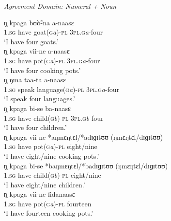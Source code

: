 \begin{exe}
  \ex\label{ex:NUM-domnum}\textit{Agreement Domain: Numeral + Noun}\\

\begin{xlist}
\ex\label{ex:NUM-domnumA.pl}
\gll   ŋ̩  kpaga   bʊ̃ʊ̃-na a-naasɛ  \\
       \textsc{1.sg}  {have}  {goat(\textsc{g}\textit{a})-\textsc{pl}} 
{\textsc{3pl.g}\textit{a}-four} \\
\glt `I have four goats.' \\


\ex\label{ex:NUM-domnumH-.pl}
\gll   ŋ̩  kpaga vii-ne  a-naasɛ  \\
        \textsc{1.sg}  {have}  {pot(\textsc{g}\textit{a})-\textsc{pl}}  
{\textsc{3pl.g}\textit{a}-four} \\
\glt `I have four cooking pots.' \\


\ex\label{ex:NUM-domabst.pl}
\gll  ŋ̩ ŋma  taa-ta a-naasɛ  \\
        \textsc{1.sg}  {speak}  {language(\textsc{g}\textit{a})-\textsc{pl}}  
{\textsc{3pl.g}\textit{a}-four} \\
\glt `I speak four languages.' \\


\ex\label{ex:NUM-domnumH+.pl}
\gll   ŋ̩  kpaga bi-se  ba-naasɛ \\
        \textsc{1.sg}  {have}  {child(\textsc{g}\textit{b})-\textsc{pl}}  
{\textsc{3pl.g}\textit{b}-four} \\
\glt `I have four children.' \\

\ex\label{ex:NUM-ungramhum-}
\gll   ŋ̩  kpaga vii-ne   *aŋmɛŋtɛl/*adɪɡɪtʊʊ (ŋmɛŋtɛl/dɪɡɪtʊʊ)\\
        \textsc{1.sg}  {have}  {pot(\textsc{g}\textit{a})-\textsc{pl}}  
{} {eight/nine} \\
\glt `I have eight/nine cooking pots.' \\

\ex\label{ex:NUM-ungramhum+}
\gll   ŋ̩  kpaga bi-se   *baŋmɛŋtɛl/*badɪɡɪtʊʊ (ŋmɛŋtɛl/dɪɡɪtʊʊ)\\
     \textsc{1.sg}  {have}  {child(\textsc{g}\textit{b})-\textsc{pl}} 
{} {eight/nine} \\
\glt `I have eight/nine children.' \\

\ex\label{ex:NUM-domnumH+.sg}
\gll     ŋ̩  kpaga vii-ne fidanaasɛ \\
        \textsc{1.sg}  {have}  {pot(\textsc{g}\textit{a})-\textsc{pl}}  
{fourteen} \\
\glt `I have fourteen cooking pots.' \\



\end{xlist}
\end{exe}
